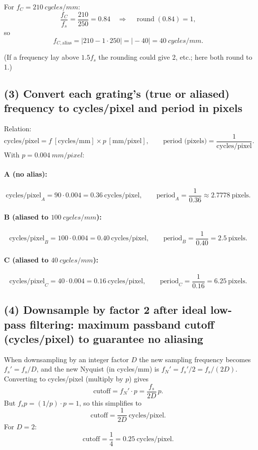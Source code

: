 \documentclass[12pt,a4paper]{article}
\begin{document}
For \(f_C=\SI{210}{cycles/mm}\):
\[
\frac{f_C}{f_s}=\frac{210}{250}=0.84 \quad\Rightarrow\quad \operatorname{round}(0.84)=1,
\]
so
\[
f_{C,\text{alias}}=\big|210 - 1\cdot250\big|=\big|-40\big|=\SI{40}{cycles/mm}.
\]

(If a frequency lay above \(1.5f_s\) the rounding could give 2, etc.; here both round to 1.)

\subsection*{(3) Convert each grating’s (true or aliased) frequency to cycles/pixel and period in pixels}

Relation:
\[
\text{cycles/pixel} = f\ [\text{cycles/mm}]\times p\ [\text{mm/pixel}],\qquad
\text{period (pixels)} = \frac{1}{\text{cycles/pixel}}.
\]
With \(p=\SI{0.004}{mm/pixel}\):

\paragraph{A (no alias):}
\[
\text{cycles/pixel}_A = 90\cdot0.004 = 0.36\ \text{cycles/pixel},
\qquad \text{period}_A = \frac{1}{0.36}\approx 2.7778\ \text{pixels}.
\]

\paragraph{B (aliased to \(\SI{100}{cycles/mm}\)):}
\[
\text{cycles/pixel}_B = 100\cdot0.004 = 0.40\ \text{cycles/pixel},
\qquad \text{period}_B = \frac{1}{0.40} = 2.5\ \text{pixels}.
\]

\paragraph{C (aliased to \(\SI{40}{cycles/mm}\)):}
\[
\text{cycles/pixel}_C = 40\cdot0.004 = 0.16\ \text{cycles/pixel},
\qquad \text{period}_C = \frac{1}{0.16} = 6.25\ \text{pixels}.
\]

\subsection*{(4) Downsample by factor 2 after ideal low-pass filtering: maximum passband cutoff (cycles/pixel) to guarantee no aliasing}

When downsampling by an integer factor \(D\) the new sampling frequency becomes \(f_s' = f_s/D\), and the new Nyquist (in cycles/mm) is \(f_N' = f_s' / 2 = f_s/(2D)\). Converting to cycles/pixel (multiply by \(p\)) gives
\[
\text{cutoff} = f_N' \cdot p = \frac{f_s}{2D}\,p.
\]
But \(f_s p = (1/p)\cdot p = 1\), so this simplifies to
\[
\boxed{\text{cutoff}=\frac{1}{2D}\ \text{cycles/pixel}.}
\]
For \(D=2\):
\[
\text{cutoff}=\frac{1}{4}=\boxed{0.25\ \text{cycles/pixel}}.
\]
\end{document}
